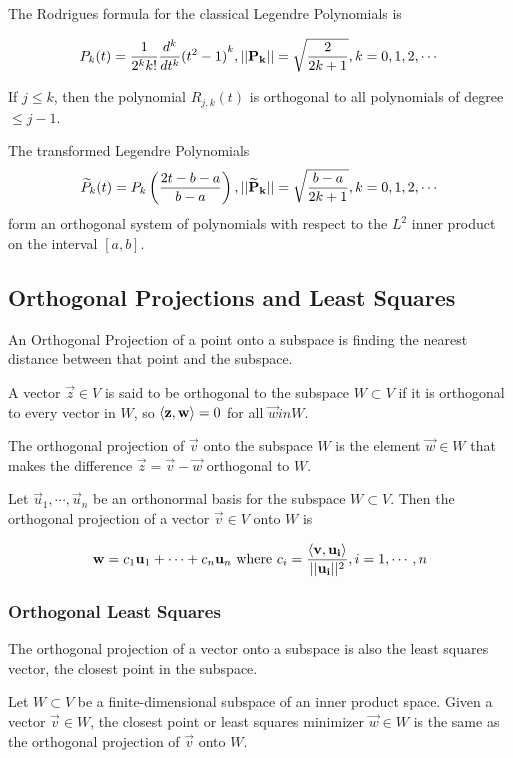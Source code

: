    The Rodrigues formula for the classical Legendre Polynomials is

        \[ P_k(t) = \frac{1}{2^k k!} \frac{d^k}{dt^k} {(t^2 - 1)}^k, \lvert \lvert \mathbf{P_k} \rvert \rvert = \sqrt{\frac{2}{2k + 1} }, k = 0, 1, 2, \cdots \]

    If $j \le k$, then the polynomial $R_{j,k}(t)$ is orthogonal to all polynomials of degree $\le j - 1$.

    The transformed Legendre Polynomials \[ \widetilde{P}_k(t) = P_k \left( \frac{2t - b - a}{b - a} \right), \lvert \lvert \mathbf{\widetilde{P}_k} \rvert \rvert = \sqrt{\frac{b-a}{2k + 1} }, k=0, 1, 2, \cdots \] form an orthogonal system of polynomials with respect to the $L^2$ inner product on the interval $[a, b]$.

    \subsection{Orthogonal Projections and Least Squares}
    An Orthogonal Projection of a point onto a subspace is finding the nearest distance between that point and the subspace.

    A vector $\vec{z} \in V$ is said to be orthogonal to the subspace $W \subset V$ if it is orthogonal to every vector in $W$, so $\left\langle \mathbf{z}, \mathbf{w} \right\rangle = 0$ for all $\vec{w} in W$.

    The orthogonal projection of $\vec{v}$ onto the subspace $W$ is the element $\vec{w} \in W$ that makes the difference $\vec{z} = \vec{v} - \vec{w}$ orthogonal to $W$.

    Let $\vec{u}_1, \cdots, \vec{u}_n$ be an orthonormal basis for the subspace $W \subset V$. Then the orthogonal projection of a vector $\vec{v} \in V$ onto $W$ is

        \[ \mathbf{w} = c_1 \mathbf{u}_1 + \cdots + c_n \mathbf{u}_n \text{ where } c_i = \frac{\left\langle \mathbf{v}, \mathbf{u_i} \right\rangle }{\lvert \lvert \mathbf{u_i} \rvert \rvert^2}, i = 1, \cdots, n \]

        \subsubsection{Orthogonal Least Squares}
        The orthogonal projection of a vector onto a subspace is also the least squares vector, the closest point in the subspace.

        Let $W \subset V$ be a finite-dimensional subspace of an inner product space. Given a vector $\vec{v} \in W$, the closest point or least squares minimizer $\vec{w} \in W$ is the same as the orthogonal projection of $\vec{v}$ onto $W$.

